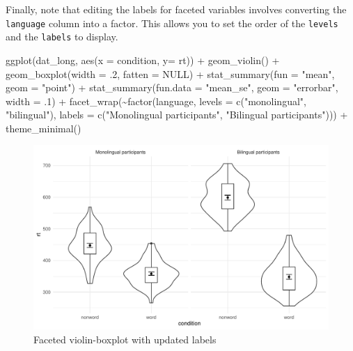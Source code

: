 \documentclass[
  english,
  doc,floatsintext]{apa6}
\newenvironment{Shaded}{\begin{snugshade}}{\end{snugshade}}
\newcommand{\AttributeTok}[1]{\textcolor[rgb]{0.77,0.63,0.00}{#1}}
\newcommand{\ConstantTok}[1]{\textcolor[rgb]{0.00,0.00,0.00}{#1}}
\newcommand{\DecValTok}[1]{\textcolor[rgb]{0.00,0.00,0.81}{#1}}
\newcommand{\FunctionTok}[1]{\textcolor[rgb]{0.00,0.00,0.00}{#1}}
\newcommand{\NormalTok}[1]{#1}
\newcommand{\SpecialCharTok}[1]{\textcolor[rgb]{0.00,0.00,0.00}{#1}}
\newcommand{\StringTok}[1]{\textcolor[rgb]{0.31,0.60,0.02}{#1}}
\begin{document}
Finally, note that editing the labels for faceted variables involves converting the \texttt{language} column into a factor. This allows you to set the order of the \texttt{levels} and the \texttt{labels} to display.

\begin{Shaded}
\begin{Highlighting}[]
\FunctionTok{ggplot}\NormalTok{(dat\_long, }\FunctionTok{aes}\NormalTok{(}\AttributeTok{x =}\NormalTok{ condition, }\AttributeTok{y=}\NormalTok{ rt)) }\SpecialCharTok{+}
  \FunctionTok{geom\_violin}\NormalTok{() }\SpecialCharTok{+}
  \FunctionTok{geom\_boxplot}\NormalTok{(}\AttributeTok{width =}\NormalTok{ .}\DecValTok{2}\NormalTok{, }\AttributeTok{fatten =} \ConstantTok{NULL}\NormalTok{) }\SpecialCharTok{+}
  \FunctionTok{stat\_summary}\NormalTok{(}\AttributeTok{fun =} \StringTok{"mean"}\NormalTok{, }\AttributeTok{geom =} \StringTok{"point"}\NormalTok{) }\SpecialCharTok{+}
  \FunctionTok{stat\_summary}\NormalTok{(}\AttributeTok{fun.data =} \StringTok{"mean\_se"}\NormalTok{, }\AttributeTok{geom =} \StringTok{"errorbar"}\NormalTok{, }\AttributeTok{width =}\NormalTok{ .}\DecValTok{1}\NormalTok{) }\SpecialCharTok{+}
  \FunctionTok{facet\_wrap}\NormalTok{(}\SpecialCharTok{\textasciitilde{}}\FunctionTok{factor}\NormalTok{(language, }
                     \AttributeTok{levels =} \FunctionTok{c}\NormalTok{(}\StringTok{"monolingual"}\NormalTok{, }\StringTok{"bilingual"}\NormalTok{),}
                     \AttributeTok{labels =} \FunctionTok{c}\NormalTok{(}\StringTok{"Monolingual participants"}\NormalTok{, }
                                \StringTok{"Bilingual participants"}\NormalTok{))) }\SpecialCharTok{+}
  \FunctionTok{theme\_minimal}\NormalTok{()}
\end{Highlighting}
\end{Shaded}

\begin{figure}

{\centering \includegraphics[width=1\linewidth]{images/violin-facet-1} 

}

\caption{Faceted violin-boxplot with updated labels}\label{fig:violin-facet}
\end{figure}
\end{document}
